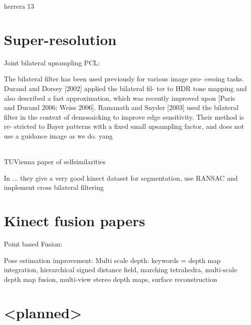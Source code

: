 \documentclass{ucl_thesis}
\begin{document}
herrera 13





\section{Super-resolution}
\label{sec:super_resolution}

Joint bilateral upsampling PCL: \citep{Kopf:2007}

The bilateral filter has been used previously for various image pro-
cessing tasks. Durand and Dorsey [2002] applied the bilateral fil-
ter to HDR tone mapping and also described a fast approximation,
which was recently improved upon [Paris and Durand 2006; Weiss
2006].
Ramanath and Snyder [2003] used the bilateral filter in the context
of demosaicking to improve edge sensitivity. Their method is re-
stricted to Bayer patterns with a fixed small upsampling factor, and
does not use a guidance image as we do.
yang

\citep{MatsuoFI13} \\
\citep{} TUVienna paper of selfsimilarities

In \citep{Silberman:ECCV12} ... they give a very good kinect dataset for segmentation, use RANSAC and implement cross bilateral filtering



\section{Kinect fusion papers}
\label{sec:kinfu}

\citep{Zhou:2013}
\citep{Chen:2013:Scalable_volumetric}
\citep{Whelan13iros}
\citep{Whelan12rssw}
Point based Fusion:
\citep{keller13realtime}

Pose estimation improvement: \citep{Whelan13icra}
Multi scale depth: \citep{Fuhrmann:2011}  keywords = depth map integration, hierarchical signed distance field, marching tetrahedra, multi-scale depth map fusion, multi-view stereo depth maps, surface reconstruction


\section{<planned>}
\end{document}
